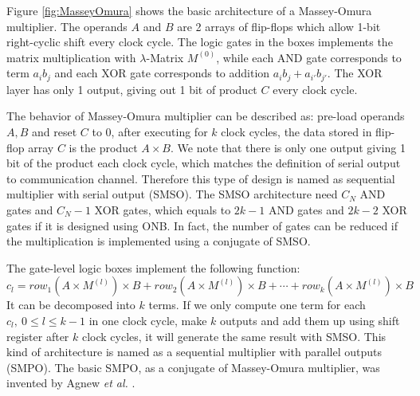 \begin{figure}[H]
\end{figure}

Figure \ref{fig:MasseyOmura} shows the basic architecture of a Massey-Omura multiplier. The operands
$A$ and $B$ are 2 arrays of flip-flops which allow 1-bit right-cyclic shift every clock cycle.
The logic gates in the boxes implements the matrix multiplication with $\lambda$-Matrix $M^{(0)}$, 
while each AND gate corresponds to term $a_ib_j$ and each XOR gate corresponds to addition $a_ib_j+a_{i'}b_{j'}$. 
The XOR layer has only 1 output, giving out 1 bit of product $C$ every clock cycle.

The behavior of Massey-Omura multiplier can be described as: pre-load operands $A,B$ and reset $C$ to 0, after 
executing for $k$ clock cycles, the data stored in flip-flop array $C$ is the product $A\times B$.
We note that there is only one output giving 1 bit of the product each clock cycle, which matches the 
definition of serial output to communication channel. Therefore this type of design is named as 
sequential multiplier with serial output (SMSO).
The SMSO architecture need $C_N$ AND gates and $C_N-1$ XOR gates, which equals to $2k-1$ AND gates and $2k-2$ XOR gates
if it is designed using ONB. In fact, the number of gates can be reduced if the multiplication is 
implemented using a conjugate of SMSO.

The gate-level logic boxes implement the following function:
\begin{equation}
\label{eqn:SMPOterms}
c_l = row_1(A\times M^{(l)}) \times B + row_2(A\times M^{(l)}) \times B + \cdots + row_{k}(A\times M^{(l)}) \times B
\end{equation}
It can be decomposed into $k$ terms. If we only compute one term for each $c_l,~0\leq l\leq k-1$ in one 
clock cycle, make $k$ outputs and add them up using shift register after $k$ clock cycles, 
it will generate the same result with SMSO. This kind of architecture is named as a 
sequential multiplier with parallel outputs (SMPO). The basic SMPO, as a conjugate of Massey-Omura multiplier,
was invented by Agnew {\it et al.} \cite{agnew1991implementation}.

